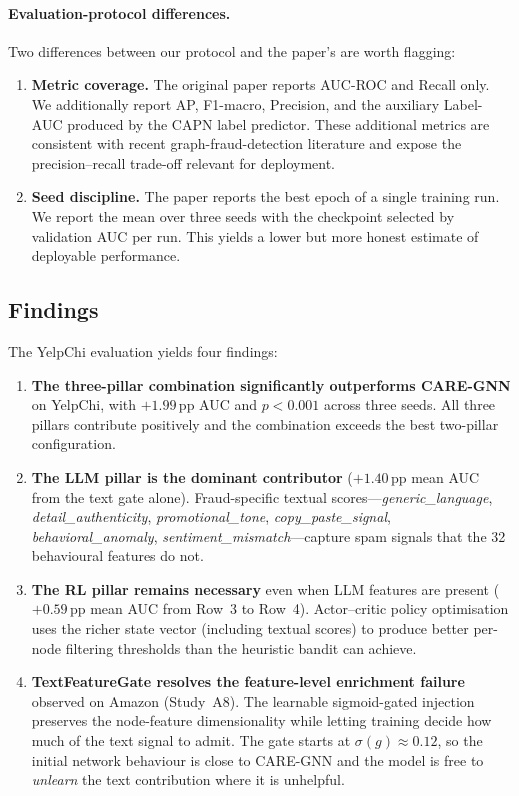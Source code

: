 \paragraph{Evaluation-protocol differences.} Two differences between our protocol and the paper's are worth flagging:
\begin{enumerate}
    \item \textbf{Metric coverage.} The original paper reports AUC-ROC and Recall only. We additionally report AP, F1-macro, Precision, and the auxiliary Label-AUC produced by the CAPN label predictor. These additional metrics are consistent with recent graph-fraud-detection literature and expose the precision--recall trade-off relevant for deployment.
    \item \textbf{Seed discipline.} The paper reports the best epoch of a single training run. We report the mean over three seeds with the checkpoint selected by validation AUC per run. This yields a lower but more honest estimate of deployable performance.
\end{enumerate}

\subsection{Findings}
\label{sec:yelp-findings}

The YelpChi evaluation yields four findings:

\begin{enumerate}
    \item \textbf{The three-pillar combination significantly outperforms CARE-GNN} on YelpChi, with $+1.99$\,pp AUC and $p < 0.001$ across three seeds. All three pillars contribute positively and the combination exceeds the best two-pillar configuration.
    \item \textbf{The LLM pillar is the dominant contributor} ($+1.40$\,pp mean AUC from the text gate alone). Fraud-specific textual scores---\textit{generic\_language}, \textit{detail\_authenticity}, \textit{promotional\_tone}, \textit{copy\_paste\_signal}, \textit{behavioral\_anomaly}, \textit{sentiment\_mismatch}---capture spam signals that the 32 behavioural features do not.
    \item \textbf{The RL pillar remains necessary} even when LLM features are present ($+0.59$\,pp mean AUC from Row~3 to Row~4). Actor--critic policy optimisation uses the richer state vector (including textual scores) to produce better per-node filtering thresholds than the heuristic bandit can achieve.
    \item \textbf{TextFeatureGate resolves the feature-level enrichment failure} observed on Amazon (Study~A8). The learnable sigmoid-gated injection preserves the node-feature dimensionality while letting training decide how much of the text signal to admit. The gate starts at $\sigma(g) \approx 0.12$, so the initial network behaviour is close to CARE-GNN and the model is free to \emph{unlearn} the text contribution where it is unhelpful.
\end{enumerate}

